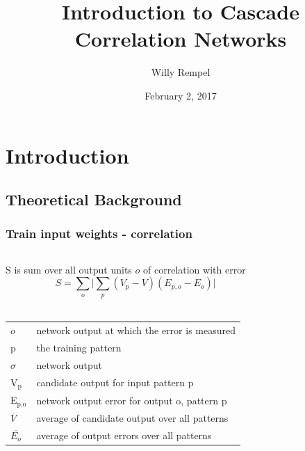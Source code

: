 \documentclass{beamer}
\title{Introduction to Cascade Correlation Networks}
\author{Willy Rempel}
\date{February 2, 2017}
\begin{document}
\frame{\titlepage}
\section[Outline]{}
\frame{\tableofcontents}

\section{Introduction}
\subsection{Theoretical Background}

\begin{frame}
  \frametitle{Train input weights - correlation}
	\begin{columns}[t]
		\begin{column}[t]{0.5\textwidth}
      \small{S is sum over all output units $\mathit{o}$ of correlation with error}
      $$ S = \sum_{o} \lvert \sum_{p} (V_{p} - V) (E_{p,o} - E_{o}) \rvert $$
     \\  
      \begin{center}
        \begin{tabular}{ll}
          \(\mathit{o}\) & \tiny{network output at which the error is measured} \\
          p & \tiny{the training pattern} \\
          \(\sigma\) & \tiny{network output} \\
          V\(_{\text{p}}\) & \tiny{candidate output for input pattern p}   \\
          E\(_{\text{p,o}}\) & \tiny{network output error for output o, pattern p} \\
          \(\overline{V}\) & \tiny{average of candidate output over all patterns} \\
          \(\overline{E_{o}}\) & \tiny{average of output errors over all patterns} \\
        \end{tabular}
      \end{center}
		\end{column}
		\begin{column}{0.5\textwidth}
      \begin{figure}
        \centering

\end{figure}
\end{column}
\end{columns}
\end{frame}
\end{document}
